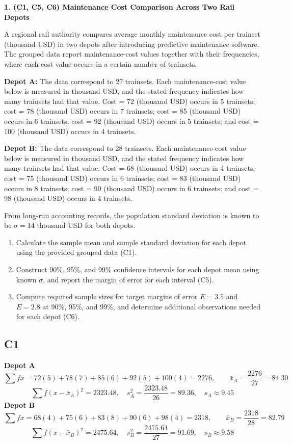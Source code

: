 	\begin{ExamProblems}
		\newpage
		\item
		\textbf{1. (C1, C5, C6) Maintenance Cost Comparison Across Two Rail Depots}
		
		A regional rail authority compares average monthly maintenance cost per trainset (thousand USD) in two depots after introducing predictive maintenance software.
		The grouped data report maintenance-cost values together with their frequencies, where each cost value occurs in a certain number of trainsets.
		
		\textbf{Depot A:} The data correspond to 27 trainsets. Each maintenance-cost value below is measured in thousand USD, and the stated frequency indicates how many trainsets had that value. Cost = 72 (thousand USD) occurs in 5 trainsets; cost = 78 (thousand USD) occurs in 7 trainsets; cost = 85 (thousand USD) occurs in 6 trainsets; cost = 92 (thousand USD) occurs in 5 trainsets; and cost = 100 (thousand USD) occurs in 4 trainsets.
		
		\textbf{Depot B:} The data correspond to 28 trainsets. Each maintenance-cost value below is measured in thousand USD, and the stated frequency indicates how many trainsets had that value. Cost = 68 (thousand USD) occurs in 4 trainsets; cost = 75 (thousand USD) occurs in 6 trainsets; cost = 83 (thousand USD) occurs in 8 trainsets; cost = 90 (thousand USD) occurs in 6 trainsets; and cost = 98 (thousand USD) occurs in 4 trainsets.
		
		From long-run accounting records, the population standard deviation is known to be $\sigma = 14$ thousand USD for both depots.
		\begin{enumerate}
			\item Calculate the sample mean and sample standard deviation for each depot using the provided grouped data (C1).
			\item Construct 90\%, 95\%, and 99\% confidence intervals for each depot mean using known $\sigma$, and report the margin of error for each interval (C5).
			\item Compute required sample sizes for target margins of error $E=3.5$ and $E=2.8$ at 90\%, 95\%, and 99\%, and determine additional observations needed for each depot (C6).
		\end{enumerate}
		
		\subsection*{C1}
		\textbf{Depot A}
		\[
		\sum fx = 72(5)+78(7)+85(6)+92(5)+100(4)=2276,
		\qquad \bar{x}_A=\frac{2276}{27}=84.30
		\]
		\[
		\sum f(x-\bar{x}_A)^2=2323.48,
		\quad s_A^2=\frac{2323.48}{26}=89.36,
		\quad s_A\approx 9.45
		\]
		\textbf{Depot B}
		\[
		\sum fx = 68(4)+75(6)+83(8)+90(6)+98(4)=2318,
		\qquad \bar{x}_B=\frac{2318}{28}=82.79
		\]
		\[
		\sum f(x-\bar{x}_B)^2=2475.64,
		\quad s_B^2=\frac{2475.64}{27}=91.69,
		\quad s_B\approx 9.58
		\]
		

\end{ExamProblems}
